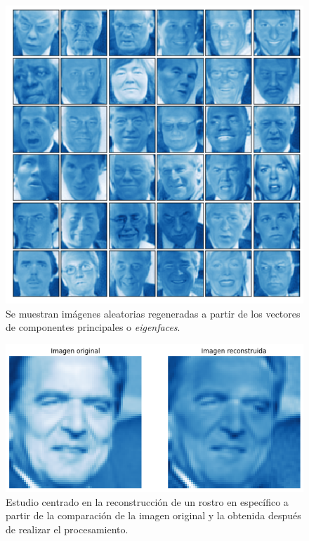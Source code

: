 \documentclass[conference]{IEEEtran}
\begin{document}
\begin{figure}[H]
    \centering
    \includegraphics[scale=0.25]{imgs/reconstructed.png}
    \caption{Se muestran imágenes aleatorias regeneradas a partir de los vectores de componentes principales o \textit{eigenfaces}.}
    \label{fig:svd_pc}
\end{figure}

\begin{figure}[H]
    \centering
    \includegraphics[scale=0.25]{imgs/reconstructed_individual.png}
    \caption{Estudio centrado en la reconstrucción de un rostro en específico a partir de la comparación de la imagen original y la obtenida después de realizar el procesamiento.}
    \label{fig:svd_pc}
\end{figure}

\end{document}
